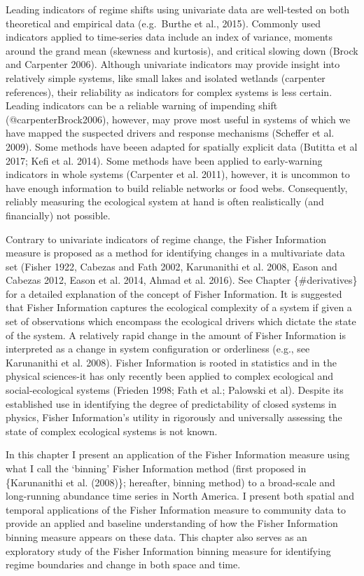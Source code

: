 \documentclass[12pt,twoside]{reedthesis}
\begin{document}
Leading indicators of regime shifts using univariate data are
well-tested on both theoretical and empirical data (e.g.~Burthe et al.,
2015). Commonly used indicators applied to time-series data include an
index of variance, moments around the grand mean (skewness and
kurtosis), and critical slowing down (Brock and Carpenter 2006).
Although univariate indicators may provide insight into relatively
simple systems, like small lakes and isolated wetlands (carpenter
references), their reliability as indicators for complex systems is less
certain. Leading indicators can be a reliable warning of impending shift
(@carpenterBrock2006), however, may prove most useful in systems of
which we have mapped the suspected drivers and response mechanisms
(Scheffer et al. 2009). Some methods have beeen adapted for spatially
explicit data (Butitta et al 2017; Kefi et al. 2014). Some methods have
been applied to early-warning indicators in whole systems (Carpenter et
al. 2011), however, it is uncommon to have enough information to build
reliable networks or food webs. Consequently, reliably measuring the
ecological system at hand is often realistically (and financially) not
possible.

Contrary to univariate indicators of regime change, the Fisher
Information measure is proposed as a method for identifying changes in a
multivariate data set (Fisher 1922, Cabezas and Fath 2002, Karunanithi
et al. 2008, Eason and Cabezas 2012, Eason et al. 2014, Ahmad et al.
2016). See Chapter \{\#derivatives\} for a detailed explanation of the
concept of Fisher Information. It is suggested that Fisher Information
captures the ecological complexity of a system if given a set of
observations which encompass the ecological drivers which dictate the
state of the system. A relatively rapid change in the amount of Fisher
Information is interpreted as a change in system configuration or
orderliness (e.g., see Karunanithi et al. 2008). Fisher Information is
rooted in statistics and in the physical sciences-it has only recently
been applied to complex ecological and social-ecological systems
(Frieden 1998; Fath et al.; Palowski et al). Despite its established use
in identifying the degree of predictability of closed systems in
physics, Fisher Information's utility in rigorously and universally
assessing the state of complex ecological systems is not known.

In this chapter I present an application of the Fisher Information
measure using what I call the `binning' Fisher Information method (first
proposed in \{Karunanithi et al. (2008)\}; hereafter, binning method) to
a broad-scale and long-running abundance time series in North America. I
present both spatial and temporal applications of the Fisher Information
measure to community data to provide an applied and baseline
understanding of how the Fisher Information binning measure appears on
these data. This chapter also serves as an exploratory study of the
Fisher Information binning measure for identifying regime boundaries and
change in both space and time.
\end{document}
